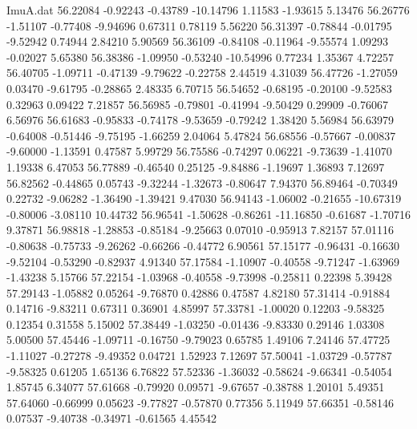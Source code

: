 \begin{filecontents}{ImuA.dat}
  56.22084   -0.92243   -0.43789  -10.14796    1.11583   -1.93615    5.13476
  56.26776   -1.51107   -0.77408   -9.94696    0.67311    0.78119    5.56220
  56.31397   -0.78844   -0.01795   -9.52942    0.74944    2.84210    5.90569
  56.36109   -0.84108   -0.11964   -9.55574    1.09293   -0.02027    5.65380
  56.38386   -1.09950   -0.53240  -10.54996    0.77234    1.35367    4.72257
  56.40705   -1.09711   -0.47139   -9.79622   -0.22758    2.44519    4.31039
  56.47726   -1.27059    0.03470   -9.61795   -0.28865    2.48335    6.70715
  56.54652   -0.68195   -0.20100   -9.52583    0.32963    0.09422    7.21857
  56.56985   -0.79801   -0.41994   -9.50429    0.29909   -0.76067    6.56976
  56.61683   -0.95833   -0.74178   -9.53659   -0.79242    1.38420    5.56984
  56.63979   -0.64008   -0.51446   -9.75195   -1.66259    2.04064    5.47824
  56.68556   -0.57667   -0.00837   -9.60000   -1.13591    0.47587    5.99729
  56.75586   -0.74297    0.06221   -9.73639   -1.41070    1.19338    6.47053
  56.77889   -0.46540    0.25125   -9.84886   -1.19697    1.36893    7.12697
  56.82562   -0.44865    0.05743   -9.32244   -1.32673   -0.80647    7.94370
  56.89464   -0.70349    0.22732   -9.06282   -1.36490   -1.39421    9.47030
  56.94143   -1.06002   -0.21655  -10.67319   -0.80006   -3.08110   10.44732
  56.96541   -1.50628   -0.86261  -11.16850   -0.61687   -1.70716    9.37871
  56.98818   -1.28853   -0.85184   -9.25663    0.07010   -0.95913    7.82157
  57.01116   -0.80638   -0.75733   -9.26262   -0.66266   -0.44772    6.90561
  57.15177   -0.96431   -0.16630   -9.52104   -0.53290   -0.82937    4.91340
  57.17584   -1.10907   -0.40558   -9.71247   -1.63969   -1.43238    5.15766
  57.22154   -1.03968   -0.40558   -9.73998   -0.25811    0.22398    5.39428
  57.29143   -1.05882    0.05264   -9.76870    0.42886    0.47587    4.82180
  57.31414   -0.91884    0.14716   -9.83211    0.67311    0.36901    4.85997
  57.33781   -1.00020    0.12203   -9.58325    0.12354    0.31558    5.15002
  57.38449   -1.03250   -0.01436   -9.83330    0.29146    1.03308    5.00500
  57.45446   -1.09711   -0.16750   -9.79023    0.65785    1.49106    7.24146
  57.47725   -1.11027   -0.27278   -9.49352    0.04721    1.52923    7.12697
  57.50041   -1.03729   -0.57787   -9.58325    0.61205    1.65136    6.76822
  57.52336   -1.36032   -0.58624   -9.66341   -0.54054    1.85745    6.34077
  57.61668   -0.79920    0.09571   -9.67657   -0.38788    1.20101    5.49351
  57.64060   -0.66999    0.05623   -9.77827   -0.57870    0.77356    5.11949
  57.66351   -0.58146    0.07537   -9.40738   -0.34971   -0.61565    4.45542

\end{filecontents}
